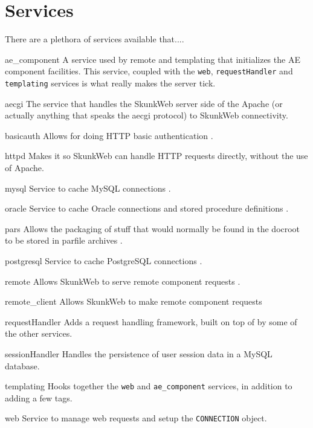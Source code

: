 \documentclass[titlepage]{manual}
\begin{document}
\section{Services}
There are a plethora of services available that....
\begin{argdesc}
\item[ae_component] A service used by remote and templating that
initializes the AE component facilities.  This service, coupled with
the \texttt{web}, \texttt{requestHandler} and \texttt{templating}
services is what really makes the server tick.

\item[aecgi] The service that handles the SkunkWeb server side of the
Apache (or actually anything that speaks the aecgi protocol) to
SkunkWeb connectivity.

\item[basicauth]  Allows for doing HTTP basic authentication .

\item[httpd] Makes it so SkunkWeb can handle HTTP requests directly,
without the use of Apache.

\item[mysql] Service to cache MySQL connections
.

\item[oracle] Service to cache Oracle connections and stored procedure
definitions .

\item[pars]  Allows the packaging of stuff that would normally be found in
the docroot to be stored in parfile archives .

\item[postgresql] Service to cache PostgreSQL connections
.

\item[remote] Allows SkunkWeb to serve remote component requests
.

\item[remote_client] Allows SkunkWeb to make remote component requests

\item[requestHandler]  Adds a request handling framework, built on top
of by some of the other services.

\item[sessionHandler]  Handles the persistence of user session data in
a MySQL database.

\item[templating] Hooks together the \texttt{web} and \texttt{ae_component}
services, in addition to adding a few tags.


\item[web] Service to manage web requests and setup the
\texttt{CONNECTION} object.
\end{argdesc}
\end{document}
